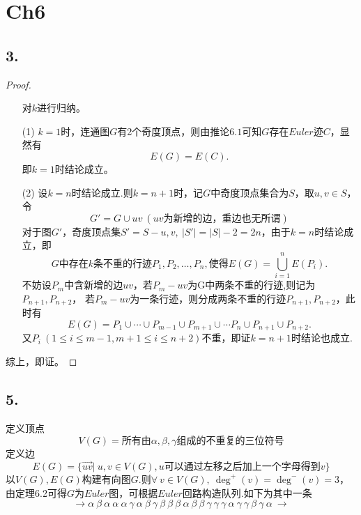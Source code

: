 \documentclass{article}
\begin{document}
\section*{Ch6}
\subsection*{3.}
\begin{proof}
    \begin{enumerate}
        \item []对$k$进行归纳。
        \item [(1)]$k=1$时，连通图$G$有2个奇度顶点，则由推论$6.1$可知$G$存在$Euler$迹$C$，显然有
        \[
            E(G)=E(C).    
        \]
        即$k=1$时结论成立。
        \item [(2)]设$k=n$时结论成立.则$k=n+1$时，记$G$中奇度顶点集合为$S$，取$u,v\in S$，令
        \[
            G'=G\cup uv\ (uv\mbox{为新增的边，重边也无所谓})    
        \]
        对于图$G'$，奇度顶点集$S'=S-{u,v},\ |S'|=|S|-2=2n$，由于$k=n$时结论成立，即
        \[
            G\mbox{中存在}k\mbox{条不重的行迹}P_1,P_2,\ldots,P_n,\mbox{使得}E(G)=\bigcup_{i=1}^{n}E(P_i).
        \]
        不妨设$P_m$中含新增的边$uv$，若$P_m -uv$为G中两条不重的行迹,则记为$P_{n+1},P_{n+2}$，
        若$P_m-uv$为一条行迹，则分成两条不重的行迹$P_{n+1},P_{n+2}$，此时有
        \[
            E(G)=P_1 \cup \cdots \cup P_{m-1} \cup P_{m+1}\cup \cdots P_{n} \cup P_{n+1}\cup P_{n+2}.
        \]
        又$P_i\ (1\leq i\leq m-1,m+1\leq i\leq n+2)$不重，即证$k=n+1$时结论也成立.
    \end{enumerate}
    综上，即证。
\end{proof}
\subsection*{5.}
定义顶点
\[
    V(G)=\mbox{所有由}\alpha,\beta,\gamma\mbox{组成的不重复的三位符号}
\]
定义边
\[
    E(G)=\{\overrightarrow{uv} |\ u,v\in V(G),u\mbox{可以通过左移之后加上一个字母得到}v\}
\]
以$V(G),E(G)$构建有向图$G$.则$\forall\ v\in V(G),\ \deg^{+}(v)=\deg^{-}(v)=3$，
由定理6.2可得$G$为$Euler$图，可根据$Euler$回路构造队列.如下为其中一条
\[
    \rightarrow 
    \alpha\ \beta\ \alpha\ \alpha\ \alpha\ \gamma\  
    \alpha\ \beta\ \gamma\ \beta\ \beta\ \beta\ 
    \alpha\ \beta\ \beta\ \gamma\ \gamma\ \gamma\
    \alpha\ \gamma\  \gamma\ \beta\ \gamma\ \alpha\
    \rightarrow
\]
\end{document}
